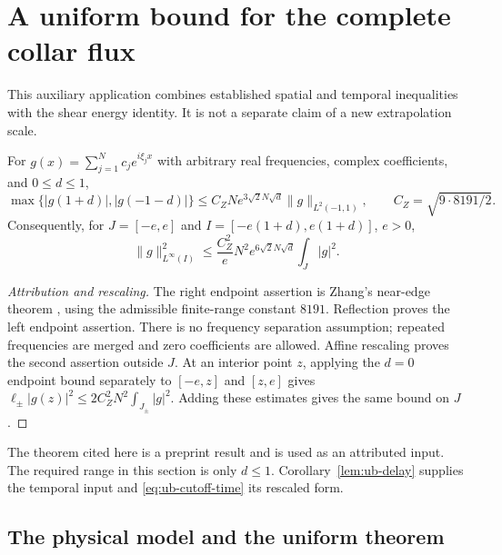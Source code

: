 \section{A uniform bound for the complete collar flux}
\label{sec:upper-bound}

This auxiliary application combines established spatial and temporal
inequalities with the shear energy identity. It is not a separate claim
of a new extrapolation scale.

\begin{lemma}\label{thm:ub-edge}
For $g(x)=\sum_{j=1}^N c_j e^{i\xi_jx}$ with arbitrary real frequencies,
complex coefficients, and $0\le d\le1$,
\begin{equation}\label{eq:ub-edge}
 \max\{|g(1+d)|,|g(-1-d)|\}
 \le C_ZN e^{3\sqrt2N\sqrt d}\|g\|_{L^2(-1,1)},
 \qquad C_Z=\sqrt{9\cdot8191/2}.
\end{equation}
Consequently, for $J=[-e,e]$ and $I=[-e(1+d),e(1+d)]$, $e>0$,
\begin{equation}\label{eq:ub-affine-edge}
 \|g\|_{L^\infty(I)}^2
 \le\frac{C_Z^2}{e}N^2e^{6\sqrt2N\sqrt d}\int_J|g|^2.
\end{equation}
\end{lemma}

\begin{proof}[Attribution and rescaling]
The right endpoint assertion is Zhang's near-edge theorem
\cite[Theorem 1.1 and Proposition 4.2, v1]{Zhang2026}, using the
admissible finite-range constant $8191$. Reflection proves the left
endpoint assertion. There is no frequency separation assumption;
repeated frequencies are merged and zero coefficients are allowed.
Affine rescaling proves the second assertion outside $J$. At an
interior point $z$, applying the $d=0$ endpoint bound separately to
$[-e,z]$ and $[z,e]$ gives
$\ell_\pm|g(z)|^2\le2C_Z^2N^2\int_{J_\pm}|g|^2$.
Adding these estimates gives the same bound on $J$.
\end{proof}

The theorem cited here is a preprint result and is used as an
attributed input. The required range in this section is only $d\le1$.
Corollary~\ref{lem:ub-delay} supplies the temporal input and
\eqref{eq:ub-cutoff-time} its rescaled form.

\subsection{The physical model and the uniform theorem}

